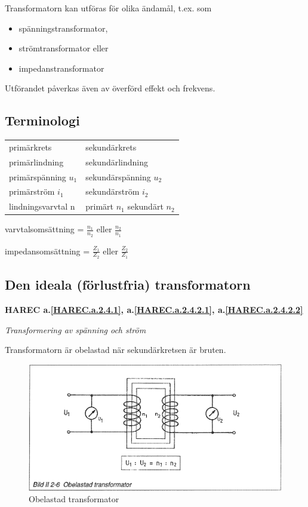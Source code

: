Transformatorn kan utföras för olika ändamål, t.ex. som
\begin{itemize}
\item spänningstransformator,
\item strömtransformator eller
\item impedanstransformator
\end{itemize}
Utförandet påverkas även av överförd effekt
och frekvens.

\subsection{Terminologi}

\begin{tabular}{ll}
primärkrets & sekundärkrets \\
primärlindning & sekundärlindning \\
primärspänning \(u_1\) &  sekundärspänning \(u_2\) \\
primärström \(i_1\) & sekundärström \(i_2\) \\
lindningsvarvtal n & primärt \(n_1\) sekundärt \(n_2\)
\end{tabular}

varvtalsomsättning = \(\frac{n_1}{n_2}\) eller \(\frac{n_2}{n_1}\)

impedansomsättning = \(\frac{Z_1}{Z_2}\) eller \(\frac{Z_2}{Z_1}\)

\subsection{Den ideala (förlustfria) transformatorn}
\textbf{HAREC a.\ref{HAREC.a.2.4.1}, a.\ref{HAREC.a.2.4.2.1},
a.\ref{HAREC.a.2.4.2.2}\label{myHAREC.a.2.4.1}
\label{myHAREC.a.2.4.2.1}\label{myHAREC.a.2.4.2.2}}

\emph{Transformering av spänning och ström}

Transformatorn är obelastad när sekundärkretsen är bruten.

\begin{figure}[h]
\begin{center}
\includegraphics[width=14cm]{images/bild_2_2-06}
\caption{Obelastad transformator}
\label{fig:BildII2-6}
\end{center}
\end{figure}

